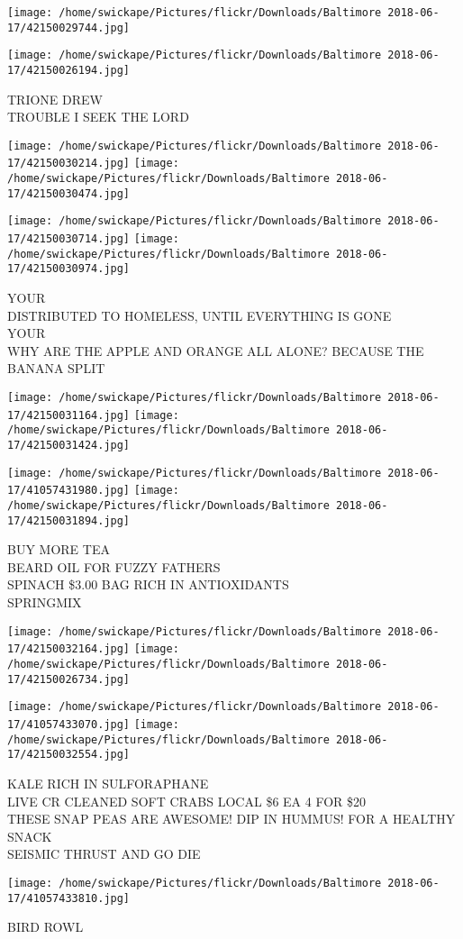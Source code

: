 \documentclass[10pt,letterpaper]{article}
\begin{document}
\texttt{[image: /home/swickape/Pictures/flickr/Downloads/Baltimore 2018-06-17/42150029744.jpg]}

\vspace{0.25in}
\texttt{[image: /home/swickape/Pictures/flickr/Downloads/Baltimore 2018-06-17/42150026194.jpg]}

TRIONE DREW\\
TROUBLE I SEEK THE LORD
\pagebreak

\texttt{[image: /home/swickape/Pictures/flickr/Downloads/Baltimore 2018-06-17/42150030214.jpg]}
\texttt{[image: /home/swickape/Pictures/flickr/Downloads/Baltimore 2018-06-17/42150030474.jpg]}

\texttt{[image: /home/swickape/Pictures/flickr/Downloads/Baltimore 2018-06-17/42150030714.jpg]}
\texttt{[image: /home/swickape/Pictures/flickr/Downloads/Baltimore 2018-06-17/42150030974.jpg]}

YOUR\\
DISTRIBUTED TO HOMELESS, UNTIL EVERYTHING IS GONE\\
YOUR\\
WHY ARE THE APPLE AND ORANGE ALL ALONE?  BECAUSE THE BANANA SPLIT
\pagebreak

\texttt{[image: /home/swickape/Pictures/flickr/Downloads/Baltimore 2018-06-17/42150031164.jpg]}
\texttt{[image: /home/swickape/Pictures/flickr/Downloads/Baltimore 2018-06-17/42150031424.jpg]}

\texttt{[image: /home/swickape/Pictures/flickr/Downloads/Baltimore 2018-06-17/41057431980.jpg]}
\texttt{[image: /home/swickape/Pictures/flickr/Downloads/Baltimore 2018-06-17/42150031894.jpg]}

BUY MORE TEA\\
BEARD OIL FOR FUZZY FATHERS\\
SPINACH \$3.00 BAG RICH IN ANTIOXIDANTS\\
SPRINGMIX
\pagebreak

\texttt{[image: /home/swickape/Pictures/flickr/Downloads/Baltimore 2018-06-17/42150032164.jpg]}
\texttt{[image: /home/swickape/Pictures/flickr/Downloads/Baltimore 2018-06-17/42150026734.jpg]}

\texttt{[image: /home/swickape/Pictures/flickr/Downloads/Baltimore 2018-06-17/41057433070.jpg]}
\texttt{[image: /home/swickape/Pictures/flickr/Downloads/Baltimore 2018-06-17/42150032554.jpg]}

KALE RICH IN SULFORAPHANE\\
LIVE CR CLEANED SOFT CRABS LOCAL \$6 EA 4 FOR \$20\\
THESE SNAP PEAS ARE AWESOME!  DIP IN HUMMUS!  FOR A HEALTHY SNACK\\
SEISMIC THRUST AND GO DIE
\pagebreak

\texttt{[image: /home/swickape/Pictures/flickr/Downloads/Baltimore 2018-06-17/41057433810.jpg]}

BIRD ROWL
\pagebreak
\end{document}
